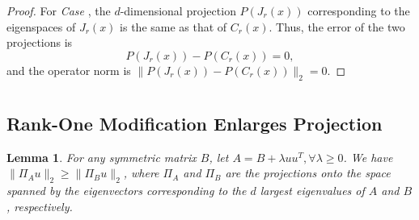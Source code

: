 \documentclass[aos,preprint]{imsart}
\newtheorem{lemma}[theorem]{Lemma}
\theoremstyle{remark}
\newtheorem*{remark}{Remark}
\begin{document}
\begin{appendix}
\begin{proof}
For {\it Case {}},  the $d$-dimensional projection $P(J_r(x))$ corresponding to the eigenspaces of $J_r(x)$ is the same as that of $C_r(x)$. Thus, the error of the two projections is
\[
P(J_r(x)) - P(C_r(x)) = 0,
\]
and the operator norm is $\|P(J_r(x)) - P(C_r(x))\|_2=0$.

\end{proof}

\section{}
\subsection{Rank-One Modification Enlarges Projection}
\begin{lemma}
{For any symmetric matrix $B$, let $A = B +\lambda uu^T, \forall \lambda\geq 0$. We  have $\|\Pi_A u\|_2\geq \|\Pi_B u\|_2$, where $\Pi_A$ and $\Pi_B$ are the projections onto the space spanned by the eigenvectors corresponding to the $d$ largest eigenvalues of $A$ and $B$, respectively.}
\label{projection_enlarge}
\end{lemma}



\end{appendix}
\end{document}
